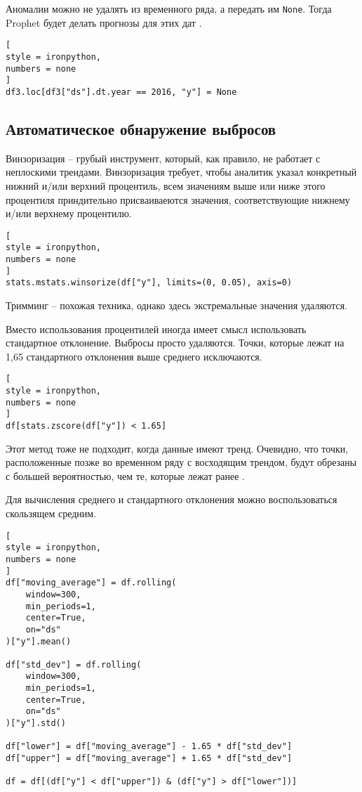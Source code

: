 \documentclass[%
	11pt,
	a4paper,
	utf8,
		]{article}
\begin{document}
Аномалии можно не удалять из временного ряда, а передать им \verb|None|. Тогда Prophet будет делать прогнозы для этих дат \cite[]{gruzdev:time-series-2022}.
\begin{lstlisting}[
style = ironpython,
numbers = none
]
df3.loc[df3["ds"].dt.year == 2016, "y"] = None
\end{lstlisting}

\subsection{Автоматическое обнаружение выбросов}

Винзоризация -- грубый инструмент, который, как правило, не работает с неплоскими трендами. Винзоризация требует, чтобы аналитик указал конкретный нижний и/или верхний процентиль, всем значениям выше или ниже этого процентиля приндительно присваиваеются значения, соответствующие нижнему и/или верхнему процентилю.
\begin{lstlisting}[
style = ironpython,
numbers = none
]
stats.mstats.winsorize(df["y"], limits=(0, 0.05), axis=0)
\end{lstlisting}

Тримминг -- похожая техника, однако здесь экстремальные значения удаляются.

Вместо использования процентилей иногда имеет смысл использовать стандартное отклонение. Выбросы просто удаляются. Точки, которые лежат на 1,65 стандартного отклонения выше среднего исключаются.
\begin{lstlisting}[
style = ironpython,
numbers = none
]
df[stats.zscore(df["y"]) < 1.65]
\end{lstlisting}

Этот метод тоже не подходит, когда данные имеют тренд. Очевидно, что точки, расположенные позже во временном ряду с восходящим трендом, будут обрезаны с большей вероятностью, чем те, которые лежат ранее \cite[]{gruzdev:time-series-2022}.

Для вычисления среднего и стандартного отклонения можно воспользоваться скользящем средним.
\begin{lstlisting}[
style = ironpython,
numbers = none
]
df["moving_average"] = df.rolling(
    window=300,
    min_periods=1,
    center=True,
    on="ds"
)["y"].mean()

df["std_dev"] = df.rolling(
    window=300,
    min_periods=1,
    center=True,
    on="ds"
)["y"].std()

df["lower"] = df["moving_average"] - 1.65 * df["std_dev"]
df["upper"] = df["moving_average"] + 1.65 * df["std_dev"]

df = df[(df["y"] < df["upper"]) & (df["y"] > df["lower"])]
\end{lstlisting}
\end{document}
